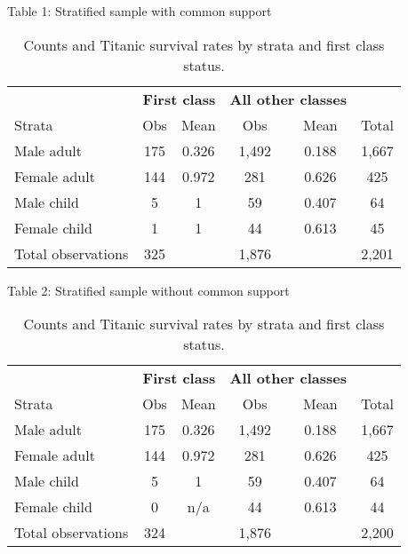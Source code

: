 \documentclass{beamer}
\begin{document}
\begin{frame}{Table 1: Stratified sample with common support}

{\renewcommand{\arraystretch}{1.1}
\tabcolsep 		
\begin{table}\small{}
\caption{Counts and Titanic survival rates by strata and first class status.}
\centering
\begin{tabular}{lcc|cc|c}
\toprule
\multicolumn{1}{c}{\textbf{}}&
\multicolumn{2}{c}{\textbf{First class}}&
\multicolumn{2}{c}{\textbf{All other classes}}&
\multicolumn{1}{c}{\textbf{}}\\
\multicolumn{1}{l}{Strata}&
\multicolumn{1}{c}{Obs}&
\multicolumn{1}{c}{Mean}&
\multicolumn{1}{c}{Obs}&
\multicolumn{1}{c}{Mean}&
\multicolumn{1}{c}{Total}\\
\midrule
Male adult		& 175	& 0.326	& 1,492	& 0.188	& 1,667 \\
Female adult	& 144	& 0.972	& 281	& 0.626	& 425 \\
Male child		& 5		& 1		& 59		& 0.407 	& 64\\
Female child	& 1		& 1		& 44		& 0.613 	& 45\\
\midrule
Total	observations	& 325	&&	1,876	 && 2,201\\
\bottomrule
\end{tabular}
\label{tab:titanic-counts}
\end{table}}

\end{frame}

\begin{frame}{Table 2: Stratified sample without common support}

{\renewcommand{\arraystretch}{1.1}
\tabcolsep 		
\begin{table}\small{}
\caption{Counts and Titanic survival rates by strata and first class status.}
\centering
\begin{tabular}{lcc|cc|c}
\toprule
\multicolumn{1}{c}{\textbf{}}&
\multicolumn{2}{c}{\textbf{First class}}&
\multicolumn{2}{c}{\textbf{All other classes}}&
\multicolumn{1}{c}{\textbf{}}\\
\multicolumn{1}{l}{Strata}&
\multicolumn{1}{c}{Obs}&
\multicolumn{1}{c}{Mean}&
\multicolumn{1}{c}{Obs}&
\multicolumn{1}{c}{Mean}&
\multicolumn{1}{c}{Total}\\
\midrule
Male adult		& 175	& 0.326	& 1,492	& 0.188	& 1,667 \\
Female adult	& 144	& 0.972	& 281	& 0.626	& 425 \\
Male child		& 5		& 1		& 59		& 0.407 	& 64\\
Female child	& 0		& n/a		& 44		& 0.613 	& 44\\
\midrule
Total	observations	& 324	&&	1,876	 && 2,200\\
\bottomrule
\end{tabular}
\label{tab:titanic-counts}
\end{table}}

\end{frame}
\end{document}

